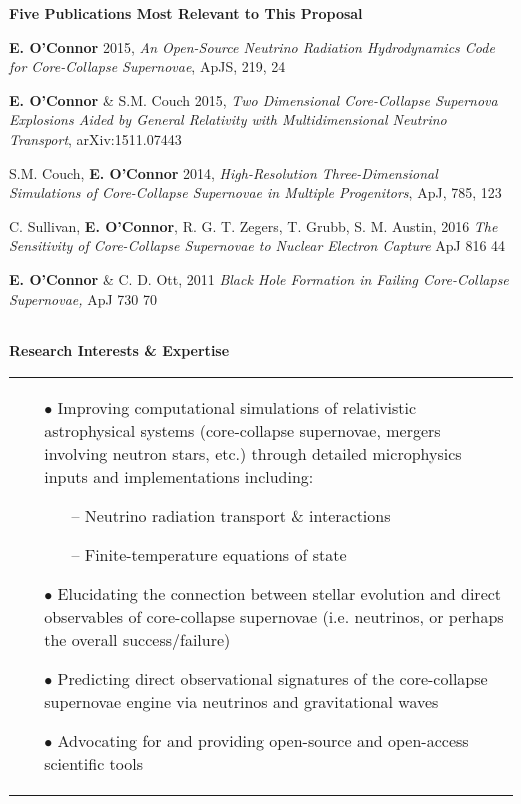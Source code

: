 \documentclass[10pt,letterpaper]{article}
\begin{document}
{\large \bf Five Publications Most Relevant to This Proposal}

{\bf E. O'Connor} 2015, \emph{An Open-Source Neutrino Radiation
  Hydrodynamics Code for Core-Collapse Supernovae}, ApJS,  219, 24

{\bf E. O'Connor} \& S.M. Couch 2015, \emph{Two Dimensional
  Core-Collapse Supernova Explosions Aided by General Relativity with
  Multidimensional Neutrino Transport}, arXiv:1511.07443

S.M. Couch, {\bf E. O'Connor} 2014, \emph{High-Resolution
  Three-Dimensional Simulations of Core-Collapse Supernovae in
  Multiple Progenitors}, ApJ, 785, 123

C. Sullivan, {\bf E. O'Connor}, R. G. T. Zegers, T. Grubb,
S. M. Austin, 2016 \emph{The Sensitivity of Core-Collapse Supernovae to
  Nuclear Electron Capture} ApJ 816 44

{\bf E. O'Connor} \& C. D. Ott, 2011 \emph{Black Hole Formation in
  Failing Core-Collapse Supernovae,} ApJ 730 70

\begin{tabular*}{\textwidth}{l}\hline\end{tabular*}
{\large \bf Research Interests \& Expertise}
\\
\begin{tabular*}{\textwidth}{p{15cm}}
  \begin{enumerate}
  \item[$\bullet$] Improving computational simulations of relativistic
    astrophysical systems (core-collapse supernovae, mergers involving
    neutron stars, etc.)  through detailed microphysics inputs and
    implementations including:
    \begin{enumerate}
      \item[--] Neutrino radiation transport \& interactions
      \item[--] Finite-temperature equations of state
    \end{enumerate}
  \item[$\bullet$] Elucidating the connection between stellar
    evolution and direct observables of core-collapse supernovae
    (i.e. neutrinos, or perhaps the overall success/failure)
  \item[$\bullet$] Predicting direct observational signatures of the 
    core-collapse supernovae engine via neutrinos and gravitational
    waves
  \item[$\bullet$] Advocating for and providing open-source and
    open-access scientific tools 
  \end{enumerate}
\end{tabular*}
\end{document}
